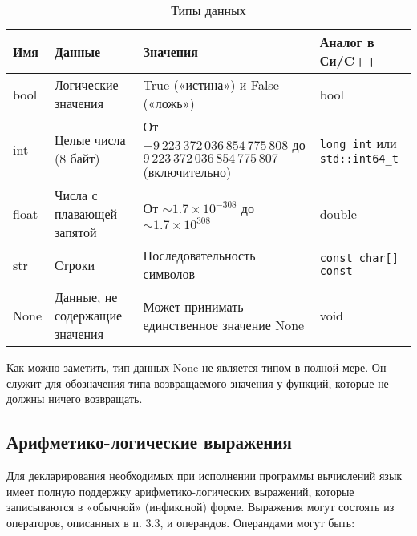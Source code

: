 \begin{table}[h]
    \centering
    \caption{Типы данных}
    \label{tab:data_types}
    \begin{tabular}{lp{3cm}p{4cm}p{3cm}}
        \toprule
        \textbf{Имя} & \textbf{Данные}                & \textbf{Значения}                                                                         & \textbf{Аналог в Си/C++}                     \\
        \midrule
        bool         & Логические значения            & True («истина») и False («ложь»)                                                          & bool                                         \\
        \addlinespace
        int          & Целые числа (8 байт)           & От $-9\,223\,372\,036\,854\,775\,808$ до $9\,223\,372\,036\,854\,775\,807$ (включительно) & \texttt{long int} или \texttt{std::int64\_t} \\
        \addlinespace
        float        & Числа с плавающей запятой      & От $\sim 1.7 \times 10^{-308}$ до $\sim 1.7 \times 10^{308}$                              & double                                       \\
        \addlinespace
        str          & Строки                         & Последовательность символов                                                               & \texttt{const char[] const}                  \\
        \addlinespace
        None         & Данные, не содержащие значения & Может принимать единственное значение None                                                & void                                         \\
        \bottomrule
    \end{tabular}
\end{table}

Как можно заметить, тип данных None не является типом в полной мере. Он служит для обозначения типа возвращаемого значения у функций, которые не должны ничего возвращать.

\subsection{Арифметико-логические выражения}

Для декларирования необходимых при исполнении программы вычислений язык имеет полную поддержку арифметико-логических выражений, которые записываются в «обычной» (инфиксной) форме. Выражения могут состоять из операторов, описанных в п. 3.3, и операндов. Операндами могут быть:

